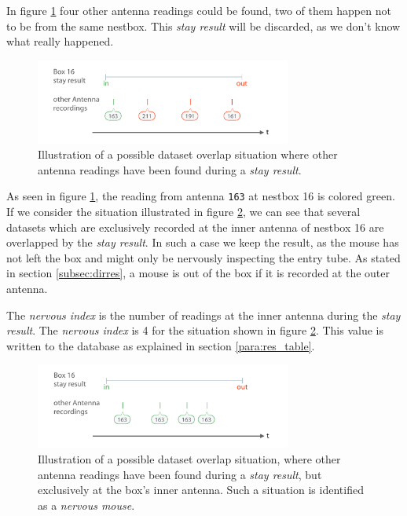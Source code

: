 In figure \ref{fig:dataset_overlap} four other antenna readings could be found, two of them happen not to be from the same nestbox. This \textit{stay result} will be discarded, as we don't know what really happened.

\begin{figure}[htpb]
\begin{center}
  \includegraphics[width=0.75\textwidth]{assets/pdf/dataset_overlap_schema.pdf}
  \caption[Dataset overlap situation]{Illustration of a possible dataset overlap situation where other antenna readings have been found during a \textit{stay result}.}
  \label{fig:dataset_overlap}
\end{center}
\end{figure}

As seen in figure \ref{fig:dataset_overlap}, the reading from antenna \lstinline|163| at nestbox 16 is colored green. If we consider the situation illustrated in figure \ref{fig:dataset_overlap_nervous}, we can see that several datasets which are exclusively recorded at the inner antenna of nestbox 16 are overlapped by the \textit{stay result}. In such a case we keep the result, as the mouse has not left the box and might only be nervously inspecting the entry tube. As stated in section \ref{subsec:dirres}, a mouse is out of the box if it is recorded at the outer antenna. 

The \textit{nervous index} is the number of readings at the inner antenna during the \textit{stay result}. The \textit{nervous index} is 4 for the situation shown in figure \ref{fig:dataset_overlap_nervous}. This value is written to the database as explained in section \ref{para:res_table}.

\begin{figure}[htpb]
\begin{center}
  \includegraphics[width=0.75\textwidth]{assets/pdf/dataset_overlap_nervous_schema.pdf}
  \caption[Dataset overlap situation for a \textit{nervous mouse}]{Illustration of a possible dataset overlap situation, where other antenna readings have been found during a \textit{stay result}, but exclusively at the box's inner antenna. Such a situation is identified as a \textit{nervous mouse}.}
  \label{fig:dataset_overlap_nervous}
\end{center}
\end{figure}
 

